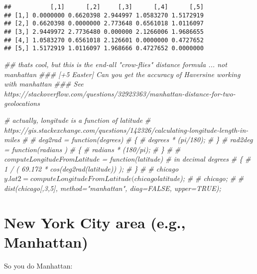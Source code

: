 \documentclass[
]{article}
\newenvironment{Shaded}{\begin{snugshade}}{\end{snugshade}}
\newcommand{\CommentTok}[1]{\textcolor[rgb]{0.56,0.35,0.01}{\textit{#1}}}
\begin{document}
\begin{verbatim}
##           [,1]      [,2]     [,3]      [,4]      [,5]
## [1,] 0.0000000 0.6620398 2.944997 1.0583270 1.5172919
## [2,] 0.6620398 0.0000000 2.773648 0.6561018 1.0116097
## [3,] 2.9449972 2.7736480 0.000000 2.1266006 1.9686655
## [4,] 1.0583270 0.6561018 2.126601 0.0000000 0.4727652
## [5,] 1.5172919 1.0116097 1.968666 0.4727652 0.0000000
\end{verbatim}

\begin{Shaded}
\begin{Highlighting}[]
\CommentTok{\#\# that\textquotesingle{}s cool, but this is the end{-}all "crow{-}flies" distance formula ... not manhattan}
\CommentTok{\#\#\# [+5 Easter] Can you get the accuracy of Haversine working with manhattan}
\CommentTok{\#\#\# See https://stackoverflow.com/questions/32923363/manhattan{-}distance{-}for{-}two{-}geolocations}

\CommentTok{\# actually, longitude is a function of latitude}
\CommentTok{\# https://gis.stackexchange.com/questions/142326/calculating{-}longitude{-}length{-}in{-}miles}
\CommentTok{\# }
\CommentTok{\# deg2rad = function(degrees)}
\CommentTok{\#   \{}
\CommentTok{\#    degrees * (pi/180);}
\CommentTok{\#   \}}
\CommentTok{\# rad2deg = function(radians )}
\CommentTok{\#   \{}
\CommentTok{\#   radians * (180/pi);}
\CommentTok{\#   \}}
\CommentTok{\# }
\CommentTok{\# computeLongitudeFromLatitude = function(latitude)  \# in decimal degrees}
\CommentTok{\#   \{}
\CommentTok{\#   1 / ( 69.172 * cos(deg2rad(latitude)) );  }
\CommentTok{\#   \}}
\CommentTok{\# }
\CommentTok{\# chicago$y.lat2 = computeLongitudeFromLatitude(chicago$latitude);}
\CommentTok{\# }
\CommentTok{\# chicago;}
\CommentTok{\# }
\CommentTok{\# dist(chicago[,3,5], method="manhattan", diag=FALSE, upper=TRUE);}
\end{Highlighting}
\end{Shaded}

\hypertarget{new-york-city-area-e.g.-manhattan}{%
\section{New York City area (e.g.,
Manhattan)}\label{new-york-city-area-e.g.-manhattan}}

So you do Manhattan:
\end{document}
